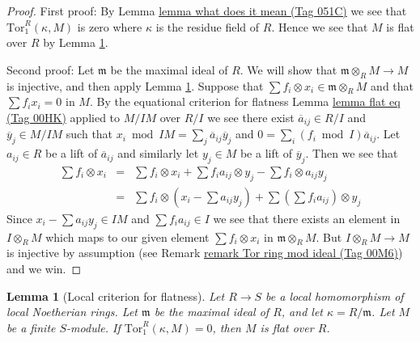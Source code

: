 \documentclass{amsart}
\theoremstyle{plain}
\newtheorem{lemma}[subsection]{Lemma}
\theoremstyle{definition}
\theoremstyle{remark}
\numberwithin{equation}{subsection}
\begin{document}
\begin{proof}
First proof: By
Lemma \href{https://stacks.math.columbia.edu/tag/051C}{lemma what does it mean (Tag 051C)}
we see that $\text{Tor}_1^R(\kappa, M)$ is zero where $\kappa$
is the residue field of $R$. Hence we see that $M$
is flat over $R$ by
Lemma \ref{lemma-local-criterion-flatness}.

\medskip\noindent
Second proof: Let $\mathfrak m$ be the maximal ideal of $R$.
We will show that $\mathfrak m \otimes_R M \to M$ is injective,
and then apply
Lemma \ref{lemma-local-criterion-flatness}.
Suppose that $\sum f_i \otimes x_i \in \mathfrak m \otimes_R M$
and that $\sum f_i x_i = 0$ in $M$. By the equational criterion
for flatness Lemma \href{https://stacks.math.columbia.edu/tag/00HK}{lemma flat eq (Tag 00HK)} applied to $M/IM$
over $R/I$ we see there exist $\overline{a}_{ij} \in R/I$
and $\overline{y}_j \in M/IM$ such that
$x_i \bmod IM = \sum_j \overline{a}_{ij} \overline{y}_j $
and $0 = \sum_i (f_i \bmod I) \overline{a}_{ij}$.
Let $a_{ij} \in R$ be a lift of $\overline{a}_{ij}$ and
similarly let $y_j \in M$ be a lift of $\overline{y}_j$.
Then we see that
\begin{eqnarray*}
\sum f_i \otimes x_i
& = &
\sum f_i \otimes x_i +
\sum f_ia_{ij} \otimes y_j -
\sum f_i \otimes a_{ij} y_j
\\
& = &
\sum f_i \otimes (x_i - \sum a_{ij} y_j) +
\sum (\sum f_i a_{ij}) \otimes y_j
\end{eqnarray*}
Since $x_i - \sum a_{ij} y_j \in IM$ and
$\sum f_i a_{ij} \in I$ we see that there exists
an element in $I \otimes_R M$ which maps to our given
element $\sum f_i \otimes x_i$ in $\mathfrak m \otimes_R M$.
But $I \otimes_R M \to M$ is injective by assumption (see
Remark \href{https://stacks.math.columbia.edu/tag/00M6}{remark Tor ring mod ideal (Tag 00M6)}) and we win.
\end{proof}


\begin{lemma}[Local criterion for flatness]
\label{lemma-local-criterion-flatness}
Let $R \to S$ be a local homomorphism of local Noetherian
rings. Let $\mathfrak m$ be the maximal ideal of $R$,
and let $\kappa = R/\mathfrak m$.
Let $M$ be a finite $S$-module. If $\text{Tor}_1^R(\kappa, M) = 0$,
then $M$ is flat over $R$.
\end{lemma}
\end{document}
